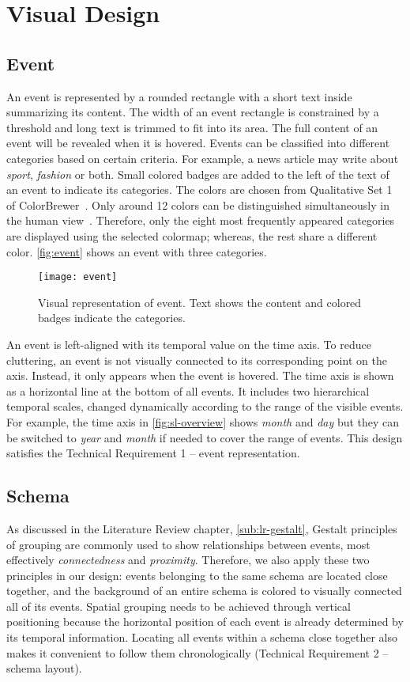 \section{Visual Design}

\subsection{Event}
An event is represented by a rounded rectangle with a short text inside summarizing its content. The width of an event rectangle is constrained by a threshold and long text is trimmed to fit into its area. The full content of an event will be revealed when it is hovered. Events can be classified into different categories based on certain criteria. For example, a news article may write about \emph{sport}, \emph{fashion} or both. Small colored badges are added to the left of the text of an event to indicate its categories. The colors are chosen from Qualitative Set 1 of  ColorBrewer~\cite{Harrower2003}. Only around 12 colors can be distinguished simultaneously in the human view~\cite{Munzner2014}. Therefore, only the eight most frequently appeared categories are displayed using the selected colormap; whereas, the rest share a different color. \autoref{fig:event} shows an event with three categories.

\begin{figure}[!htb]
\centering
\texttt{[image: event]}
\caption{Visual representation of event. Text shows the content and colored badges indicate the categories.}
\label{fig:event}
\end{figure}

An event is left-aligned with its temporal value on the time axis. To reduce cluttering, an event is not visually connected to its corresponding point on the axis. Instead, it only appears when the event is hovered. The time axis is shown as a horizontal line at the bottom of all events. It includes two hierarchical temporal scales, changed dynamically according to the range of the visible events. For example, the time axis in \autoref{fig:sl-overview} shows \emph{month} and \emph{day} but they can be switched to \emph{year} and \emph{month} if needed to cover the range of events. This design satisfies the Technical Requirement 1 -- event representation.

\subsection{Schema}
\label{sub:schema}
As discussed in the Literature Review chapter, \autoref{sub:lr-gestalt}, Gestalt principles of grouping are commonly used to show relationships between events, most effectively \emph{connectedness} and \emph{proximity}. Therefore, we also apply these two principles in our design: events belonging to the same schema are located close together, and the background of an entire schema is colored to visually connected all of its events. Spatial grouping needs to be achieved through vertical positioning because the horizontal position of each event is already determined by its temporal information. Locating all events within a schema close together also makes it convenient to follow them chronologically (Technical Requirement 2 -- schema layout).

